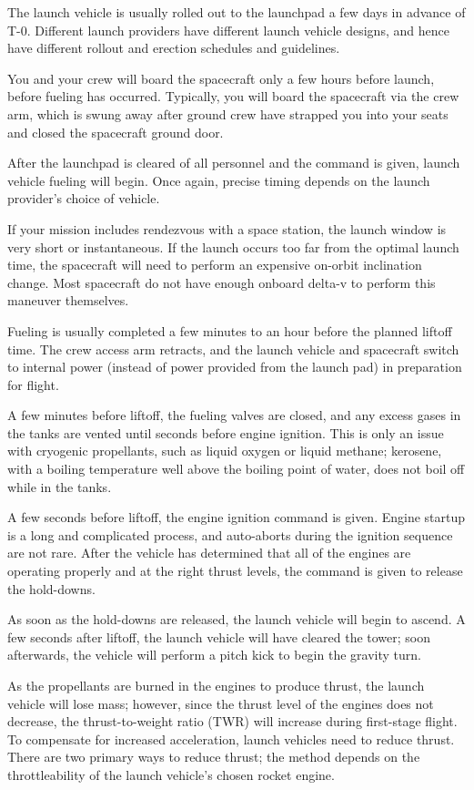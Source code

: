 \documentclass[oneside,a5paper]{book}
\begin{document}
The launch vehicle is usually rolled out to the launchpad a few days
in advance of T-0. Different launch providers have different launch
vehicle designs, and hence have different rollout and erection
schedules and guidelines.

You and your crew will board the spacecraft only a few hours before
launch, before fueling has occurred. Typically, you will board the
spacecraft via the crew arm, which is swung away after ground crew
have strapped you into your seats and closed the spacecraft ground
door.

After the launchpad is cleared of all personnel and the command is
given, launch vehicle fueling will begin. Once again, precise timing
depends on the launch provider’s choice of vehicle.

If your mission includes rendezvous with a space station, the launch
window is very short or instantaneous. If the launch occurs too far
from the optimal launch time, the spacecraft will need to perform an
expensive on-orbit inclination change. Most spacecraft do not have
enough onboard delta-v to perform this maneuver themselves.

Fueling is usually completed a few minutes to an hour before the
planned liftoff time. The crew access arm retracts, and the launch
vehicle and spacecraft switch to internal power (instead of power
provided from the launch pad) in preparation for flight.

A few minutes before liftoff, the fueling valves are closed, and any
excess gases in the tanks are vented until seconds before engine
ignition. This is only an issue with cryogenic propellants, such as
liquid oxygen or liquid methane; kerosene, with a boiling temperature
well above the boiling point of water, does not boil off while in the
tanks.

A few seconds before liftoff, the engine ignition command is
given. Engine startup is a long and complicated process, and
auto-aborts during the ignition sequence are not rare. After the
vehicle has determined that all of the engines are operating properly
and at the right thrust levels, the command is given to release the
hold-downs.

As soon as the hold-downs are released, the launch vehicle will begin
to ascend. A few seconds after liftoff, the launch vehicle will have
cleared the tower; soon afterwards, the vehicle will perform a pitch
kick to begin the gravity turn.

As the propellants are burned in the engines to produce thrust, the
launch vehicle will lose mass; however, since the thrust level of the
engines does not decrease, the thrust-to-weight ratio (TWR) will
increase during first-stage flight. To compensate for increased
acceleration, launch vehicles need to reduce thrust. There are two
primary ways to reduce thrust; the method depends on the
throttleability of the launch vehicle’s chosen rocket engine.
\end{document}
